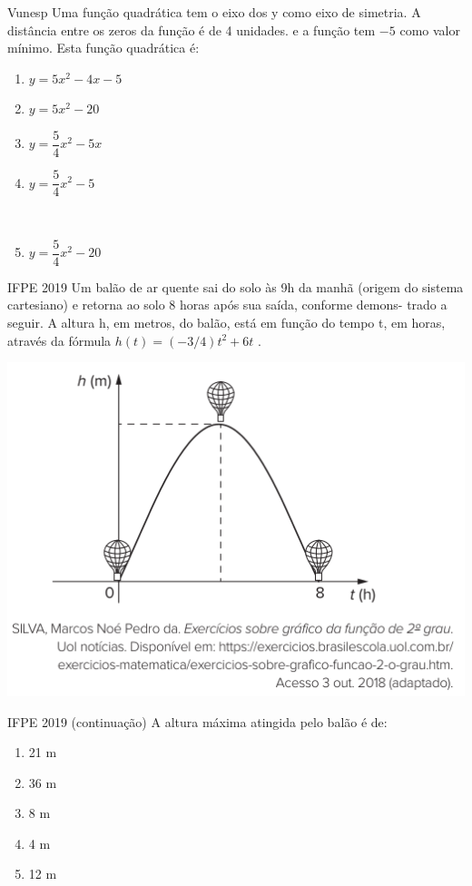 \documentclass[11pt]{beamer}
\newif\ifgab
\newcommand{\gab}[1]{%
  \ifgab
    \textcolor{red!80!black}{\textbf{#1}}%
  \else
    #1%
  \fi
}
\begin{document}
\begin{frame}{Vunesp}
    Uma função quadrática tem o eixo dos y como eixo de simetria. A distância entre os zeros da função é de 4 unidades. e a função tem $-5$ como valor mínimo. Esta função quadrática é:

    \begin{enumerate}[a]
        \item $y=5x^{2}-4x-5$
        \item $y=5x^{2}-20$ \\
        \item $y=\dfrac{5}{4}x^{2}-5x$ \\
        \item \gab{$y=\dfrac{5}{4}x^{2}-5$} \\ %
        \item $y=\dfrac{5}{4}x^{2}-20$
    \end{enumerate}
\end{frame}

\begin{frame}{IFPE 2019}
    Um balão de ar quente sai do solo às 9h da manhã (origem do sistema cartesiano) e retorna ao solo 8 horas após sua saída, conforme demons- trado a seguir. A altura h, em metros, do balão, está em função do tempo t, em horas, através da fórmula $h(t)=(-{3}/{4})t^{2}+6t$ .

    \begin{center}
        \includegraphics[scale=0.5]{imagens/IFPE 2019.png}
    \end{center}
\end{frame}

\begin{frame}{IFPE 2019 (continuação)}
    A altura máxima atingida pelo balão é de:

    \begin{enumerate}[a]
        \item \gab{21 m} %
        \item 36 m
        \item 8 m 
        \item 4 m
        \item 12 m
    \end{enumerate}
\end{frame}
\end{document}
